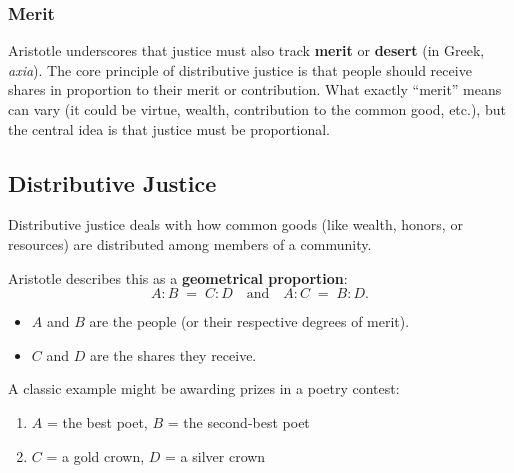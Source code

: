                 \subsubsection{Merit}

                    Aristotle underscores that justice must also track \textbf{merit} or \textbf{desert} (in Greek, \emph{axia}). The core principle of distributive justice is that people should receive shares in proportion to their merit or contribution. What exactly ``merit'' means can vary (it could be virtue, wealth, contribution to the common good, etc.), but the central idea is that justice must be proportional.

            \subsection{Distributive Justice}

                \begin{proposition}
                    Distributive justice deals with how common goods (like wealth, honors, or resources) are distributed among members of a community.
                \end{proposition}
                 
                Aristotle describes this as a \textbf{geometrical proportion}:
                \[
                A : B \;=\; C : D 
                \quad \text{and} \quad
                A : C \;=\; B : D.
                \]
                
                \begin{itemize}
                  \item $A$ and $B$ are the people (or their respective degrees of merit).
                  \item $C$ and $D$ are the shares they receive.
                \end{itemize}
                
                \begin{example}
                    A classic example might be awarding prizes in a poetry contest:
                    \begin{enumerate}
                      \item $A$ = the best poet, $B$ = the second-best poet
                      \item $C$ = a gold crown, $D$ = a silver crown
                    \end{enumerate}
                \end{example}

